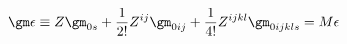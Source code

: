 \begin{equation}
\gm\epsilon\equiv Z \gm_{0s}+ \frac{1}{2!}Z^{ij}
\gm_{0ij}+\frac{1}{4!}Z^{ijkl}\gm_{0ijkls} = M \epsilon \label{qthree}
\end{equation}


